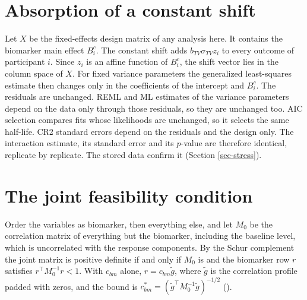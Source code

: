 \documentclass[
  11pt,
]{article}
\begin{document}
\appendix


\section{Absorption of a constant shift}\label{sec-absorb}

Let \(X\) be the fixed-effects design matrix of any analysis here. It
contains the biomarker main effect \(B^c_i\). The constant shift adds
\(b_{TV}\sigma_{TV} z_i\) to every outcome of participant \(i\). Since
\(z_i\) is an affine function of \(B^c_i\), the shift vector lies in the
column space of \(X\). For fixed variance parameters the generalized
least-squares estimate then changes only in the coefficients of the
intercept and \(B^c_i\). The residuals are unchanged. REML and ML
estimates of the variance parameters depend on the data only through
those residuals, so they are unchanged too. AIC selection compares
fits whose likelihoods are unchanged, so it selects the same
half-life. CR2 standard errors depend on the residuals and the design
only. The interaction estimate, its standard error and its \(p\)-value
are therefore identical, replicate by replicate. The stored data
confirm it (Section \ref{sec-stress}).

\section{The joint feasibility condition}\label{sec-jointfeas}

Order the variables as biomarker, then everything else, and let \(M_0\)
be the correlation matrix of everything but the biomarker, including
the baseline level, which is uncorrelated with the response
components. By the Schur complement the joint matrix is positive
definite if and only if \(M_0\) is and the biomarker row \(r\) satisfies
\(r^\top M_0^{-1} r < 1\). With \(c_{bm}\) alone, \(r = c_{bm}\tilde g\),
where \(\tilde g\) is the correlation profile padded with zeros, and the
bound is \(c_{bm}^{\ast} = (\tilde g^\top M_0^{-1}\tilde g)^{-1/2}\)
().
\end{document}
